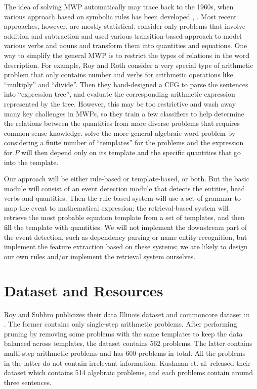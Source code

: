 \documentclass[11pt,a4paper]{article}
\begin{document}
The idea of solving MWP automatically may trace back to the 1960s, when various approach
 based on symbolic rules has been developed \citep{Bobrow:64}, \citep{Charniak:68}. Most recent approaches,
  however, are mostly statistical. \citep{Hosseini:14} consider only problems that involve addition and subtraction
  and used various transition-based approach to model various verbs and nouns and transform them into quantities
  and equations.  
One way to simplify the general MWP is to restrict the types of relations in the word description. 
For example, Roy and Roth \citep{Roy:15} \citep{Roy:16} 
 consider a very special type of arithmetic problem that only contains number and verbs for arithmetic operations like
 ``multiply'' and ``divide''. Then they hand-designed 
 a CFG to parse the sentences into ``expression tree'', and evaluate 
 the corresponding arithmetic expression represented by the tree. However, this may be too restrictive and wash away 
 many key challenges in MWPs, so they train a few classifiers to help determine the relations between the quantities 
 from more diverse problems that requires common sense knowledge.   
\citep{Kushman:14} solve the more general algebraic word problem by considering a finite number of ``templates'' for the problems and the expression for $P$ will then depend only on its template and the specific quantities that go into the template. 

Our approach will be either rule-based or template-based, or both. But the basic module will consist of an event detection module
that detects the entities, head verbs and quantities. Then the rule-based system will use a set of grammar to map the event to 
mathematical expression; the retrieval-based system will retrieve the most probable equation template from a set of templates, 
and then fill the template with quantities. We will not implement the downstream part of the event detection, such as dependency
parsing or name entity recognition, but implement the feature extraction based on these systems; we are likely to design our
own rules and/or implement the retrieval system ourselves. 

\section{Dataset and Resources}
Roy and Subhro \citep{Roy:16} publicizes their data Illinois dataset and commoncore dataset in . The former
contains only single-step arithmetic problems. After performing pruning by removing some problems with the same templates
to keep the data balanced across templates, the dataset contains 562 problems. The latter contains multi-step 
arithmetic problems
 and has 600 problems in total. All the problems in the latter do not contain irrelevant information. Kushman et. al. 
 \citep{Kushman:14} released their dataset which contains 514 algebraic problems, and each problems contain 
 around three sentences.
 
\end{document}
